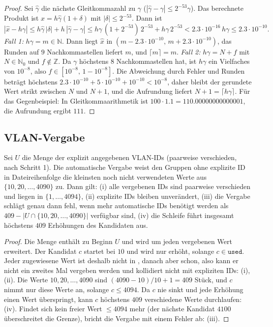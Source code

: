\begin{proof}
	Sei $\hat\gamma$ die nächste Gleitkommazahl zu $\gamma$ ($|\hat\gamma - \gamma| \le 2^{-53}\gamma$). Das berechnete Produkt ist $\hat x = h\hat\gamma(1+\delta)$ mit $|\delta| \le 2^{-53}$. Dann ist
	\[
	|\hat x - h\gamma| \le h\hat\gamma\,|\delta| + h\,|\hat\gamma-\gamma| \le h\gamma\,(1+2^{-53})\,2^{-53} + h\gamma\,2^{-53} < 2.3\cdot 10^{-16}\, h\gamma \le 2.3\cdot 10^{-10}.
	\]
	\emph{Fall 1:} $h\gamma = m \in \mathbb{N}$. Dann liegt $\hat x$ in $(m - 2.3\cdot10^{-10},\, m + 2.3\cdot 10^{-10})$, das Runden auf $9$ Nachkommastellen liefert $m$, und $\lceil m \rceil = m$.
	\emph{Fall 2:} $h\gamma = N + f$ mit $N\in\mathbb{N}_0$ und $f\notin\mathbb{Z}$. Da $\gamma$ höchstens $8$ Nachkommastellen hat, ist $h\gamma$ ein Vielfaches von $10^{-8}$, also $f \in [10^{-8},\,1-10^{-8}]$. Die Abweichung durch Fehler und Runden beträgt höchstens $2.3\cdot 10^{-10} + 5\cdot10^{-10} + 10^{-10} < 10^{-8}$, daher bleibt der gerundete Wert strikt zwischen $N$ und $N+1$, und die Aufrundung liefert $N+1 = \lceil h\gamma\rceil$.
	Für das Gegenbeispiel: In Gleitkommaarithmetik ist $100 \cdot 1.1 = 110.00000000000001$, die Aufrundung ergibt $111$.
\end{proof}

\subsection{VLAN-Vergabe}

\begin{lemma}
\label{lem:vlan}
	Sei $U$ die Menge der explizit angegebenen VLAN-IDs (paarweise verschieden, nach Schritt 1). Die automatische Vergabe weist den Gruppen ohne explizite ID in Dateireihenfolge die kleinsten noch nicht verwendeten Werte aus $\{10,20,\ldots,4090\}$ zu. Dann gilt: (i) alle vergebenen IDs sind paarweise verschieden und liegen in $\{1,\ldots,4094\}$, (ii) explizite IDs bleiben unverändert, (iii) die Vergabe schlägt genau dann fehl, wenn mehr automatische IDs benötigt werden als $409 - |U \cap \{10,20,\ldots,4090\}|$ verfügbar sind, (iv) die Schleife führt insgesamt höchstens $409$ Erhöhungen des Kandidaten aus.
\end{lemma}

\begin{proof}
	Die Menge  enthält zu Beginn $U$ und wird um jeden vergebenen Wert erweitert. Der Kandidat $c$ startet bei $10$ und wird nur erhöht, solange $c \in \texttt{used}$. Jeder zugewiesene Wert ist deshalb nicht in , danach aber schon, also kann er nicht ein zweites Mal vergeben werden und kollidiert nicht mit expliziten IDs: (i), (ii). Die Werte $10, 20, \ldots, 4090$ sind $(4090-10)/10 + 1 = 409$ Stück, und $c$ nimmt nur diese Werte an, solange $c \le 4094$. Da $c$ nie sinkt und jede Erhöhung einen Wert überspringt, kann $c$ höchstens $409$ verschiedene Werte durchlaufen: (iv). Findet sich kein freier Wert $\le 4094$ mehr (der nächste Kandidat $4100$ überschreitet die Grenze), bricht die Vergabe mit einem Fehler ab: (iii).
\end{proof}

